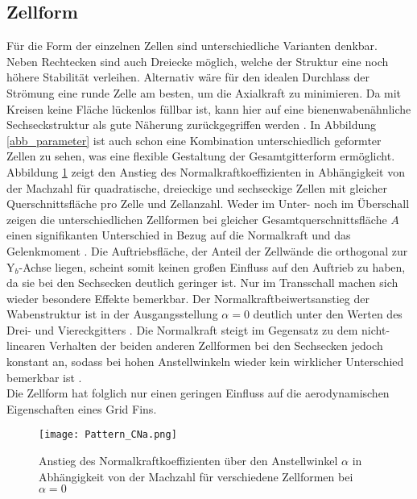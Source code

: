 \subsection{Zellform} \label{sec_zellform}
Für die Form der einzelnen Zellen sind unterschiedliche Varianten denkbar. Neben Rechtecken sind auch Dreiecke möglich, welche der Struktur eine noch höhere Stabilität verleihen. Alternativ wäre für den idealen Durchlass der Strömung eine runde Zelle am besten, um die Axialkraft zu minimieren. Da mit Kreisen keine Fläche lückenlos füllbar ist, kann hier auf eine bienenwabenähnliche Sechseckstruktur als gute Näherung zurückgegriffen werden \cite{zellform}. In Abbildung \ref{abb_parameter} ist auch schon eine Kombination unterschiedlich geformter Zellen zu sehen, was eine flexible Gestaltung der Gesamtgitterform ermöglicht.\\
Abbildung \ref{abb_Form-Cn} zeigt den Anstieg des Normalkraftkoeffizienten in Abhängigkeit von der Machzahl für quadratische, dreieckige und sechseckige Zellen mit gleicher Querschnittsfläche pro Zelle und Zellanzahl.
Weder im Unter- noch im Überschall zeigen die unterschiedlichen Zellformen bei gleicher Gesamtquerschnittsfläche $A$ einen signifikanten Unterschied in Bezug auf die Normalkraft und das Gelenkmoment \cite{zellform}. Die Auftriebsfläche, der Anteil der Zellwände die orthogonal zur Y$_b$-Achse liegen, scheint somit keinen großen Einfluss auf den Auftrieb zu haben, da sie bei den Sechsecken deutlich geringer ist. Nur im Transschall machen sich wieder besondere Effekte bemerkbar. Der Normalkraftbeiwertsanstieg der Wabenstruktur ist in der Ausgangsstellung $\alpha = 0$ deutlich unter den Werten des Drei- und Viereckgitters \cite{zellform}. Die Normalkraft steigt im Gegensatz zu dem nicht-linearen Verhalten der beiden anderen Zellformen bei den Sechsecken jedoch konstant an, sodass bei hohen Anstellwinkeln wieder kein wirklicher Unterschied bemerkbar ist \cite{zellform}.\\
Die Zellform hat folglich nur einen geringen Einfluss auf die aerodynamischen Eigenschaften eines Grid Fins.
\begin{figure}[h]
	\centering
	\texttt{[image: Pattern\_CNa.png]}
	\begin{flushright}
	\end{flushright}
	\caption{Anstieg des Normalkraftkoeffizienten über den Anstellwinkel $\alpha$ in Abhängigkeit von der Machzahl für verschiedene Zellformen bei $\alpha = 0$}
	\label{abb_Form-Cn}
\end{figure}
